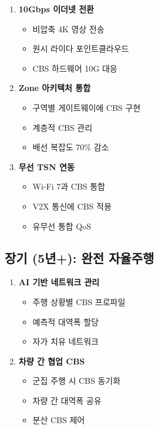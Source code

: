 \documentclass[twocolumn,10pt]{article}
\begin{document}
\begin{enumerate}
    \item \textbf{10Gbps 이더넷 전환}
        \begin{itemize}
            \item 비압축 4K 영상 전송
            \item 원시 라이다 포인트클라우드
            \item CBS 하드웨어 10G 대응
        \end{itemize}
    
    \item \textbf{Zone 아키텍처 통합}
        \begin{itemize}
            \item 구역별 게이트웨이에 CBS 구현
            \item 계층적 CBS 관리
            \item 배선 복잡도 70\% 감소
        \end{itemize}
    
    \item \textbf{무선 TSN 연동}
        \begin{itemize}
            \item Wi-Fi 7과 CBS 통합
            \item V2X 통신에 CBS 적용
            \item 유무선 통합 QoS
        \end{itemize}
\end{enumerate}

\subsection{장기 (5년+): 완전 자율주행}

\begin{enumerate}
    \item \textbf{AI 기반 네트워크 관리}
        \begin{itemize}
            \item 주행 상황별 CBS 프로파일
            \item 예측적 대역폭 할당
            \item 자가 치유 네트워크
        \end{itemize}
    
    \item \textbf{차량 간 협업 CBS}
        \begin{itemize}
            \item 군집 주행 시 CBS 동기화
            \item 차량 간 대역폭 공유
            \item 분산 CBS 제어
        \end{itemize}
\end{enumerate}
\end{document}
